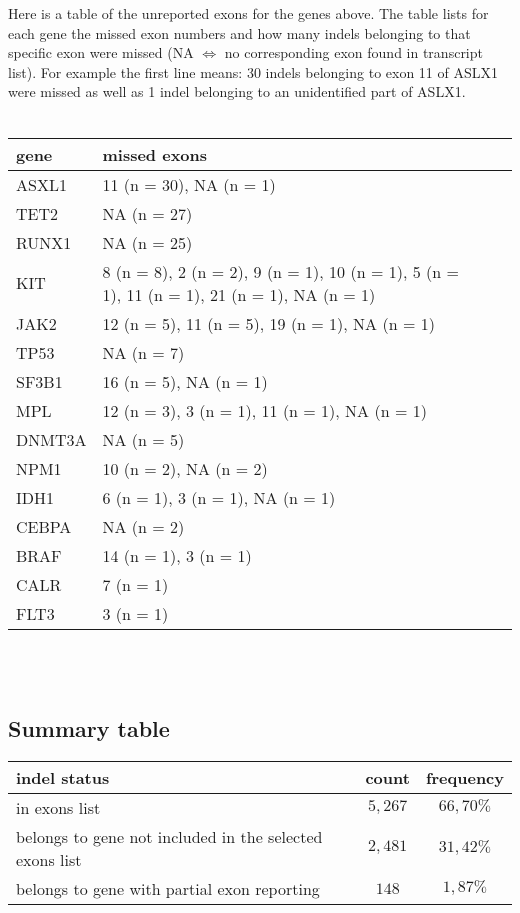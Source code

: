 \documentclass{article}
\begin{document}
\noindent
Here is a table of the unreported exons for the genes above. The table lists for each gene the missed exon numbers and how many indels belonging to that specific exon were missed (NA $\Leftrightarrow$ no corresponding exon found in transcript list). For example the first line means: 30 indels belonging to exon 11 of ASLX1 were missed as well as 1 indel belonging to an unidentified part of ASLX1.\\\\
{
	\small
	\begin{tabular}{|l|l|l|l|}
	    \hline
	    \textbf{gene} & \textbf{missed exons} \\ \hline
	    ASXL1   & 11 (n = 30), NA (n = 1) \\ \hline
	    TET2    & NA (n = 27) \\ \hline
	    RUNX1   & NA (n = 25) \\ \hline
	    KIT     & 8 (n = 8), 2 (n = 2), 9 (n = 1), 10 (n = 1), 5 (n = 1), 11 (n = 1), 21 (n = 1), NA (n = 1) \\ \hline
	    JAK2    & 12 (n = 5), 11 (n = 5), 19 (n = 1), NA (n = 1) \\ \hline
	    TP53    & NA (n = 7) \\ \hline
	    SF3B1   & 16 (n = 5), NA (n = 1) \\ \hline
	    MPL     & 12 (n = 3), 3 (n = 1), 11 (n = 1), NA (n = 1) \\ \hline
	    DNMT3A  & NA (n = 5) \\ \hline
	    NPM1    & 10 (n = 2), NA (n = 2) \\ \hline
	    IDH1    & 6 (n = 1), 3 (n = 1), NA (n = 1) \\ \hline
	    CEBPA   & NA (n = 2) \\ \hline
	    BRAF    & 14 (n = 1), 3 (n = 1) \\ \hline
	    CALR    & 7 (n = 1)\\ \hline
	    FLT3    & 3 (n = 1) \\ \hline
	\end{tabular}
}\\\\

\subsection{Summary table}
\begin{tabular}{|l|c|c|}
	\hline
	\textbf{indel status} & \textbf{count} & \textbf{frequency} \\ \hline
	in exons list                                           & $5,267$ & $66,70\%$ \\ \hline
	belongs to gene not included in the selected exons list & $2,481$ & $31,42\%$ \\ \hline
	belongs to gene with partial exon reporting             & $148$   & $1,87\%$  \\ \hline
\end{tabular}
\end{document}
